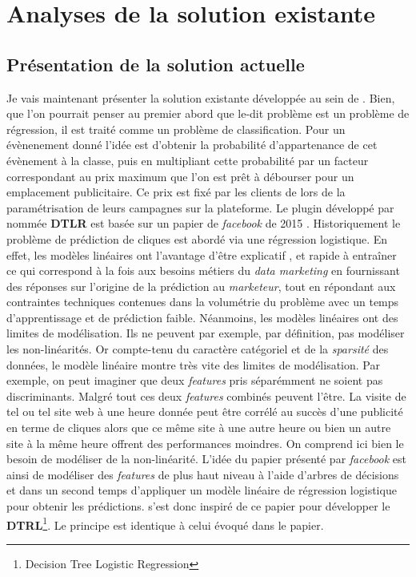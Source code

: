 \section{Analyses de la solution existante}
    \subsection{Présentation de la solution actuelle}
    Je vais maintenant présenter la solution existante développée au sein de \med. Bien, que l'on pourrait penser au premier abord que le-dit problème est un problème de régression, il est traité comme un problème de classification. Pour un évènenement donné l'idée est d'obtenir la probabilité d'appartenance de cet évènement à la classe, puis en multipliant cette probabilité par un facteur correspondant au prix maximum que l'on est prêt à débourser pour un emplacement publicitaire. Ce prix est fixé par les clients de \med lors de la paramétrisation de leurs campagnes sur la plateforme. Le plugin développé par \med nommée \textbf{DTLR} est basée sur un papier de \emph{facebook} de 2015 \cite{he2014practical}. Historiquement le problème de prédiction de cliques est abordé via une régression logistique. En effet, les modèles linéaires ont l'avantage d'être explicatif , et rapide à entraîner ce qui correspond à la fois aux besoins métiers du \emph{data marketing} en fournissant des réponses sur l'origine de la prédiction au \emph{marketeur}, tout en répondant aux contraintes techniques contenues dans la volumétrie du problème avec un temps d'apprentissage et de prédiction faible. Néanmoins, les modèles linéaires ont des limites de modélisation. Ils ne peuvent par exemple, par définition, pas modéliser les non-linéarités. Or compte-tenu du caractère catégoriel et de la \emph{sparsité} des données, le modèle linéaire montre très vite des limites de modélisation. Par exemple, on peut imaginer que deux \emph{features} pris séparémment ne soient pas discriminants. Malgré tout  ces deux \emph{features} combinés peuvent l'être. La visite de tel ou tel site web à une heure donnée peut être corrélé au succès d'une publicité en terme de cliques alors que ce même site à une autre heure ou bien un autre site à la même heure offrent des performances moindres. On comprend ici bien le besoin de modéliser de la non-linéarité. L'idée du papier présenté par \emph{facebook} est ainsi de modéliser des \emph{features} de plus haut niveau à l'aide d'arbres de décisions et dans un second temps d'appliquer un modèle linéaire de régression logistique pour obtenir les prédictions. \med s'est donc inspiré de ce papier pour développer le \bo \textbf{DTRL}\footnote{Decision Tree Logistic Regression}. Le principe est identique à celui évoqué dans le papier. 
